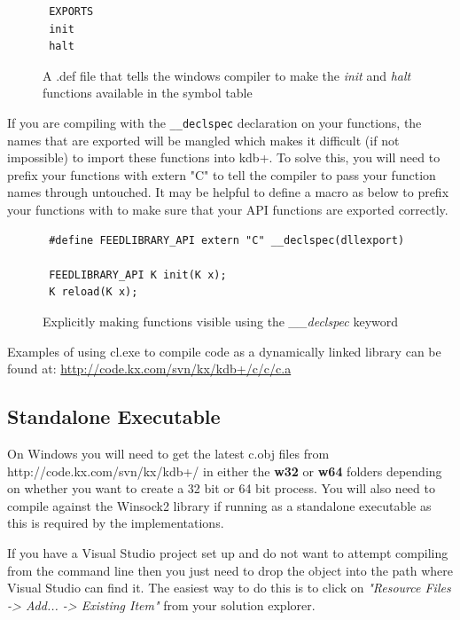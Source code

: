  \begin{figure}[h]
 \begin{lstlisting}
 EXPORTS
 init
 halt
 \end{lstlisting}
 \caption{A .def file that tells the windows compiler to make the \textit{init} and \textit{halt} functions available in the symbol table}
 \end{figure}
 
 If you are compiling with the \verb|__declspec| declaration on your functions, the names that are exported will be mangled which makes it difficult (if not impossible) to import these functions into kdb+. To solve this, you will need to prefix your functions with extern "C" to tell the compiler to pass your function names through untouched. It may be helpful to define a macro as below to prefix your functions with to make sure that your API functions are exported correctly.

\begin{figure}[h]
 \begin{lstlisting}
 #define FEEDLIBRARY_API extern "C" __declspec(dllexport)
 
 FEEDLIBRARY_API K init(K x);
 K reload(K x);
 \end{lstlisting}
 \caption{Explicitly making functions visible using the \textit{\_\_declspec} keyword}
 \end{figure}
 
 Examples of using cl.exe to compile code as a dynamically linked library can be found at: \url{http://code.kx.com/svn/kx/kdb+/c/c/c.a}
 
 \subsection{Standalone Executable}
 
 On Windows you will need to get the latest c.obj files from http://code.kx.com/svn/kx/kdb+/
 in either the \textbf{w32} or \textbf{w64} folders depending on whether you want to create a 32 bit or 64 bit
 process. You will also need to compile against the Winsock2 library if running as a standalone executable as this is required by the implementations.
 
 If you have a Visual Studio project set up and do not want to attempt compiling from the
 command line then you just need to drop the object into the path where Visual Studio can
 find it. The easiest way to do this is to click on \textit{"Resource Files -> Add... -> Existing Item"}
 from your solution explorer.
 
